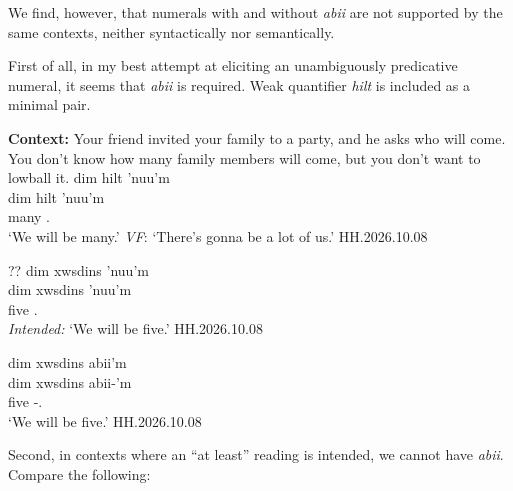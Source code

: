 \documentclass{article}
\begin{document}
We find, however, that numerals with and without \textit{abii} are not supported by the same contexts, neither syntactically nor semantically. 

First of all, in my best attempt at eliciting an unambiguously predicative numeral, it seems that \textit{abii} is required. Weak quantifier \textit{hilt} is included as a minimal pair. 

\begin{exe}
    \ex 
    \begin{xlist}
       \item \textbf{Context: }Your friend invited your family to a party, and he asks who will come. You don't know how many family members will come, but you don't want to lowball it.      
       \glll dim hilt 'nuu'm \\
    dim hilt 'nuu'm \\
    \Prosp{} many \Fpl{}.\Iii{} \\
    `We will be many.' \textit{VF}: `There's gonna be a lot of us.' \hfill HH.2026.10.08
        \item \glll ?? dim xwsdins 'nuu'm \\
      {} dim xwsdins 'nuu'm \\
     {} \Prosp{} five \Fpl{}.\Iii{} \\
    \textit{Intended: }`We will be five.' \hfill HH.2026.10.08
    \item \glll dim xwsdins abii'm \\
     dim xwsdins abii-'m \\
    \Prosp{} five \Cnt{}-\Fpl{}.\Ii{} \\
    `We will be five.' \hfill HH.2026.10.08
    \end{xlist}
\end{exe}

Second, in contexts where an ``at least'' reading is intended, we cannot have \textit{abii}. Compare the following:
\end{document}

